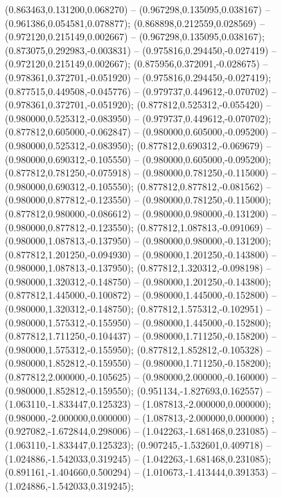  (0.863463,0.131200,0.068270) -- (0.967298,0.135095,0.038167) -- (0.961386,0.054581,0.078877);
 (0.868898,0.212559,0.028569) -- (0.972120,0.215149,0.002667) -- (0.967298,0.135095,0.038167);
 (0.873075,0.292983,-0.003831) -- (0.975816,0.294450,-0.027419) -- (0.972120,0.215149,0.002667);
 (0.875956,0.372091,-0.028675) -- (0.978361,0.372701,-0.051920) -- (0.975816,0.294450,-0.027419);
 (0.877515,0.449508,-0.045776) -- (0.979737,0.449612,-0.070702) -- (0.978361,0.372701,-0.051920);
 (0.877812,0.525312,-0.055420) -- (0.980000,0.525312,-0.083950) -- (0.979737,0.449612,-0.070702);
 (0.877812,0.605000,-0.062847) -- (0.980000,0.605000,-0.095200) -- (0.980000,0.525312,-0.083950);
 (0.877812,0.690312,-0.069679) -- (0.980000,0.690312,-0.105550) -- (0.980000,0.605000,-0.095200);
 (0.877812,0.781250,-0.075918) -- (0.980000,0.781250,-0.115000) -- (0.980000,0.690312,-0.105550);
 (0.877812,0.877812,-0.081562) -- (0.980000,0.877812,-0.123550) -- (0.980000,0.781250,-0.115000);
 (0.877812,0.980000,-0.086612) -- (0.980000,0.980000,-0.131200) -- (0.980000,0.877812,-0.123550);
 (0.877812,1.087813,-0.091069) -- (0.980000,1.087813,-0.137950) -- (0.980000,0.980000,-0.131200);
 (0.877812,1.201250,-0.094930) -- (0.980000,1.201250,-0.143800) -- (0.980000,1.087813,-0.137950);
 (0.877812,1.320312,-0.098198) -- (0.980000,1.320312,-0.148750) -- (0.980000,1.201250,-0.143800);
 (0.877812,1.445000,-0.100872) -- (0.980000,1.445000,-0.152800) -- (0.980000,1.320312,-0.148750);
 (0.877812,1.575312,-0.102951) -- (0.980000,1.575312,-0.155950) -- (0.980000,1.445000,-0.152800);
 (0.877812,1.711250,-0.104437) -- (0.980000,1.711250,-0.158200) -- (0.980000,1.575312,-0.155950);
 (0.877812,1.852812,-0.105328) -- (0.980000,1.852812,-0.159550) -- (0.980000,1.711250,-0.158200);
 (0.877812,2.000000,-0.105625) -- (0.980000,2.000000,-0.160000) -- (0.980000,1.852812,-0.159550);
 (0.951134,-1.827693,0.162557) -- (1.063110,-1.833447,0.125323) -- (1.087813,-2.000000,0.000000);
 (0.980000,-2.000000,0.000000) -- (1.087813,-2.000000,0.000000) ;
 (0.927082,-1.672844,0.298006) -- (1.042263,-1.681468,0.231085) -- (1.063110,-1.833447,0.125323);
 (0.907245,-1.532601,0.409718) -- (1.024886,-1.542033,0.319245) -- (1.042263,-1.681468,0.231085);
 (0.891161,-1.404660,0.500294) -- (1.010673,-1.413444,0.391353) -- (1.024886,-1.542033,0.319245);
